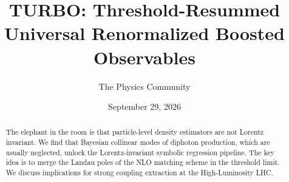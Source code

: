 \documentclass[11pt]{article}
\title{TURBO: Threshold-Resummed Universal Renormalized Boosted Observables}
\author{The Physics Community}
\date{September 29, 2026}
\numberwithin{equation}{section}
\theoremstyle{definition}
\theoremstyle{remark}
\begin{document}
\maketitle
\begin{abstract}
The elephant in the room is that particle-level density estimators are
not Lorentz invariant. We find that Bayesian collinear modes of diphoton
production, which are usually neglected, unlock the Lorentz-invariant
symbolic regression pipeline. The key idea is to merge the Landau poles
of the NLO matching scheme in the threshold limit. We discuss
implications for strong coupling extraction at the High-Luminosity LHC.
\end{abstract}
\tableofcontents





\nocite{*}


\end{document}
